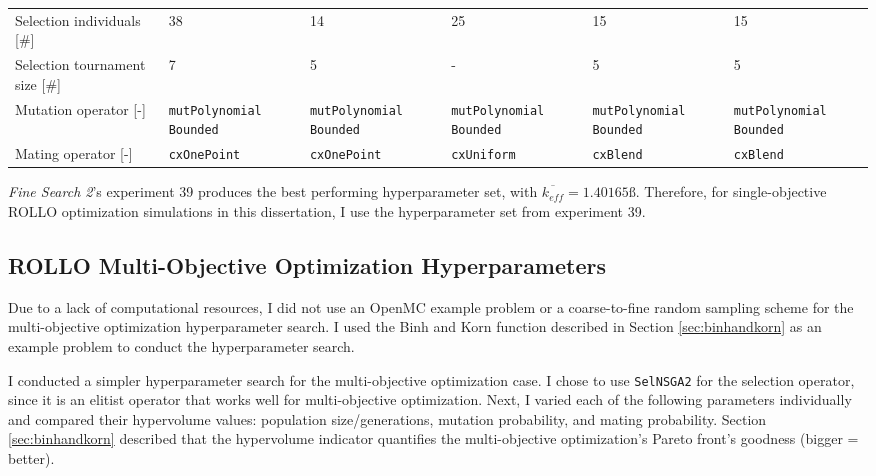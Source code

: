 \begin{table}[htbp]
{\begin{tabular}{p{3.2cm}p{2.6cm}p{2.6cm}p{2.6cm}p{2.6cm}p{2.6cm}}
    Selection individuals [\#] & 38 &14&25&15&15\\
    Selection tournament size [\#] & 7 &5&-&5&5\\
    Mutation operator [-] & \texttt{mutPolynomial} \texttt{Bounded}&\texttt{mutPolynomial} \texttt{Bounded}&\texttt{mutPolynomial} \texttt{Bounded}&\texttt{mutPolynomial} \texttt{Bounded}&\texttt{mutPolynomial} \texttt{Bounded}\\
    Mating operator [-] & \texttt{cxOnePoint} &\texttt{cxOnePoint}&\texttt{cxUniform}&\texttt{cxBlend}&\texttt{cxBlend}\\ 
    \hline
    \end{tabular}}
\end{table}
\textit{Fine Search 2}'s experiment 39 produces the best performing 
hyperparameter set, with $\overline{k_{eff}} = 1.40165ß$. 
Therefore, for single-objective ROLLO optimization simulations in this dissertation, 
I use the hyperparameter set from experiment 39. 

\subsection{ROLLO Multi-Objective Optimization Hyperparameters}
\label{sec:multi-obj-hyperparameters}
Due to a lack of computational resources, I did not use an OpenMC example problem or 
a coarse-to-fine random sampling scheme for the multi-objective optimization 
hyperparameter search.
I used the Binh and Korn function described in Section \ref{sec:binhandkorn} as 
an example problem to conduct the hyperparameter search.

I conducted a simpler hyperparameter search for the multi-objective optimization case. 
I chose to use \texttt{SelNSGA2} for the selection operator, since it is an elitist 
operator that works well for multi-objective optimization. 
Next, I varied each of the following parameters individually and compared their 
hypervolume values: population size/generations, mutation probability, and mating 
probability.
Section \ref{sec:binhandkorn} described that the hypervolume indicator quantifies 
the multi-objective optimization's Pareto front's goodness (bigger = better). 

